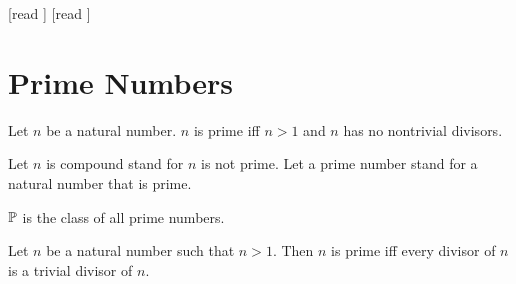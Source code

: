 \documentclass[10pt]{article}
\begin{document}
  \begin{imports}
    \begin{forthel}
      [read ]
      [read ]
    \end{forthel}
  \end{imports}


  \section*{Prime Numbers}

  \begin{forthel}
    \begin{definition}[id=ARITHMETIC_10_5450464558579712,printid]
      Let $n$ be a natural number.
      $n$ is prime iff $n > 1$ and $n$ has no nontrivial divisors.
    \end{definition}

    Let $n$ is compound stand for $n$ is not prime.
    Let a prime number stand for a natural number that is prime.
  \end{forthel}

  \begin{forthel}
    \begin{definition}[id=ARITHMETIC_10_3834705971511296,printid]
      $\mathbb{P}$ is the class of all prime numbers.
    \end{definition}
  \end{forthel}

  \begin{forthel}
    \begin{proposition}[id=ARITHMETIC_10_7801379464675328,printid]
      Let $n$ be a natural number such that $n > 1$.
      Then $n$ is prime iff every divisor of $n$ is a trivial divisor of $n$.
    \end{proposition}
  \end{forthel}
\end{document}
